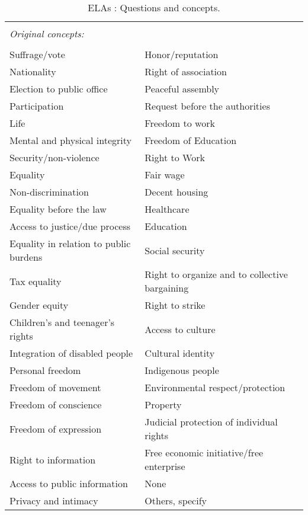 \documentclass[onecolumn]{article}
\begin{document}
\begin{table}[!htbp]
\centering
\caption{ELAs : Questions and concepts.} 
 \label{tab:qqcc} 
\begin{tabular}{ll}
\hline
\hline \\[-1.8ex] 
\textit{Original concepts:} & \\
\hline \\[-1.8ex] 
Suffrage/vote               &    Honor/reputation  \\
Nationality                  &    Right of association \\
Election to public office    &   Peaceful assembly \\
Participation                & Request before the authorities \\
Life                        & Freedom to work \\
Mental and physical integrity    & Freedom of Education \\
Security/non-violence       &   Right to Work \\
Equality                    &   Fair wage \\
Non-discrimination          & Decent housing \\
Equality before the law     & Healthcare \\
Access to justice/due process   & Education \\
Equality in relation to public burdens   & Social security \\
Tax equality            &    Right to organize and to collective bargaining \\
Gender equity           & Right to strike \\
Children's and teenager’s rights  & Access to culture \\
Integration of disabled people    & Cultural identity \\
Personal freedom              & Indigenous people \\
Freedom of movement          & Environmental respect/protection \\
Freedom of conscience      &   Property \\
Freedom of expression        & Judicial protection of individual rights \\
Right to information       & Free economic initiative/free enterprise \\
Access to public information     &  None\\  
Privacy and intimacy      &  Others, specify\\

\end{tabular}
\end{table}
\end{document}
